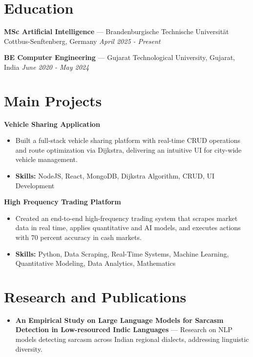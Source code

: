 \documentclass[a4paper,10pt]{article}
\begin{document}
\section*{Education}
\textbf{MSc Artificial Intelligence} — Brandenburgische Technische Universität Cottbus-Senftenberg, Germany \hfill \textit{April 2025 - Present}\par
\vspace{1.5pt}
\textbf{BE Computer Engineering} — Gujarat Technological University, Gujarat, India \hfill \textit{June 2020 - May 2024}\par

\section*{Main Projects}
\textbf{Vehicle Sharing Application}\par
\vspace{1pt}
\begin{itemize}
  \item Built a full-stack vehicle sharing platform with real-time CRUD operations and route optimization via Dijkstra, delivering an intuitive UI for city-wide vehicle management.
  \item \textbf{Skills:} NodeJS, React, MongoDB, Dijkstra Algorithm, CRUD, UI Development
\end{itemize}
\vspace{3pt}
\textbf{High Frequency Trading Platform}\par
\vspace{1pt}
\begin{itemize}
  \item Created an end-to-end high-frequency trading system that scrapes market data in real time, applies quantitative and AI models, and executes actions with 70 percent accuracy in cash markets.
  \item \textbf{Skills:} Python, Data Scraping, Real-Time Systems, Machine Learning, Quantitative Modeling, Data Analytics, Mathematics
\end{itemize}

\section*{Research and Publications}
\begin{itemize}
\item \textbf{An Empirical Study on Large Language Models for Sarcasm Detection in Low-resourced Indic Languages} — Research on NLP models detecting sarcasm across Indian regional dialects, addressing linguistic diversity.
\end{itemize}
\end{document}
